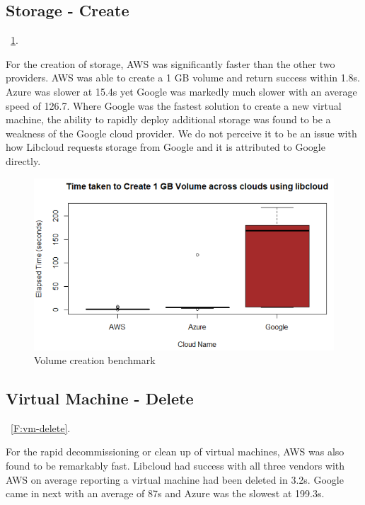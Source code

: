 \subsection{Storage - Create}~\ref{F:vm-volume}.

For the creation of storage, AWS was significantly faster than the other two
providers. AWS was able to create a 1 GB volume and return success within 1.8s.
Azure was slower at 15.4s yet Google was markedly much slower with an average
speed of 126.7. Where Google was the fastest solution to create a new virtual
machine, the ability to rapidly deploy additional storage was found to be a
weakness of the Google cloud provider. We do not perceive it to be an issue
with how Libcloud requests storage from Google and it is attributed to Google
directly.

\begin{figure}[!ht]
  \centering
  \includegraphics[width=\columnwidth]{images/Create1GBVol.png}
  \caption{Volume creation benchmark}\label{F:vm-volume}
\end{figure}

\subsection{Virtual Machine - Delete}~\ref{F:vm-delete}.

For the rapid decommissioning or clean up of virtual machines, AWS was also
found to be remarkably fast. Libcloud had success with all three vendors with
AWS on average reporting a virtual machine had been deleted in 3.2s. Google
came in next with an average of 87s and Azure was the slowest at 199.3s.

